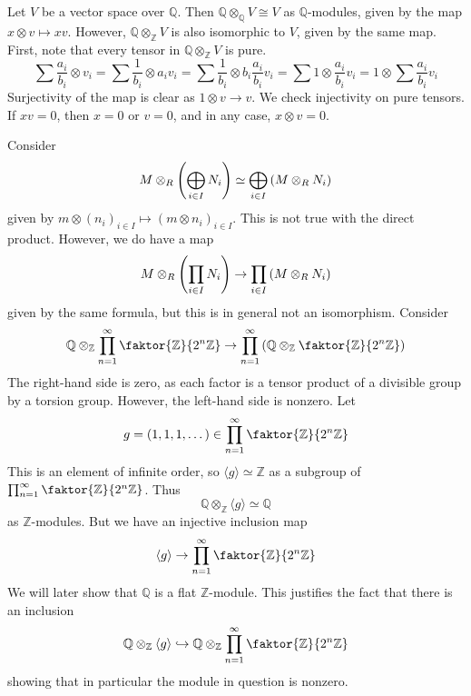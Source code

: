 \begin{example}
    Let \( V \) be a vector space over \( \mathbb Q \).
    Then \( \mathbb Q \otimes_{\mathbb Q} V \cong V \) as \( \mathbb Q \)-modules, given by the map \( x \otimes v \mapsto xv \).
    However, \( \mathbb Q \otimes_{\mathbb Z} V \) is also isomorphic to \( V \), given by the same map.
    First, note that every tensor in \( \mathbb Q \otimes_{\mathbb Z} V \) is pure.
    \[ \sum \frac{a_i}{b_i} \otimes v_i = \sum \frac{1}{b_i} \otimes a_i v_i = \sum \frac{1}{b_i} \otimes b_i \frac{a_i}{b_i} v_i = \sum 1 \otimes \frac{a_i}{b_i} v_i = 1 \otimes \sum \frac{a_i}{b_i} v_i \]
    Surjectivity of the map is clear as \( 1 \otimes v \to v \).
    We check injectivity on pure tensors.
    If \( xv = 0 \), then \( x = 0 \) or \( v = 0 \), and in any case, \( x \otimes v = 0 \).
\end{example}
\begin{example}
    Consider
    \[ M \otimes_R \qty(\bigoplus_{i \in I} N_i) \simeq \bigoplus_{i \in I} \qty(M \otimes_R N_i) \]
    given by \( m \otimes (n_i)_{i \in I} \mapsto (m \otimes n_i)_{i \in I} \).
    This is not true with the direct product.
    However, we do have a map
    \[ M \otimes_R \qty(\prod_{i \in I} N_i) \to \prod_{i \in I} \qty(M \otimes_R N_i) \]
    given by the same formula, but this is in general not an isomorphism.
    Consider
    \[ \mathbb Q \otimes_{\mathbb Z} \prod_{n = 1}^\infty \faktor{\mathbb Z}{2^n \mathbb Z} \to \prod_{n = 1}^\infty \qty(\mathbb Q \otimes_{\mathbb Z} \faktor{\mathbb Z}{2^n \mathbb Z}) \]
    The right-hand side is zero, as each factor is a tensor product of a divisible group by a torsion group.
    However, the left-hand side is nonzero.
    Let
    \[ g = (1, 1, 1, \dots) \in \prod_{n = 1}^\infty \faktor{\mathbb Z}{2^n \mathbb Z} \]
    This is an element of infinite order, so \( \langle g \rangle \simeq \mathbb Z \) as a subgroup of \( \prod_{n = 1}^\infty \faktor{\mathbb Z}{2^n \mathbb Z} \).
    Thus
    \[ \mathbb Q \otimes_{\mathbb Z} \langle g \rangle \simeq \mathbb Q \]
    as \( \mathbb Z \)-modules.
    But we have an injective inclusion map
    \[ \langle g \rangle \to \prod_{n = 1}^\infty \faktor{\mathbb Z}{2^n \mathbb Z} \]
    We will later show that \( \mathbb Q \) is a flat \( \mathbb Z \)-module.
    This justifies the fact that there is an inclusion
    \[ \mathbb Q \otimes_{\mathbb Z} \langle g \rangle \hookrightarrow \mathbb Q \otimes_{\mathbb Z} \prod_{n = 1}^\infty \faktor{\mathbb Z}{2^n \mathbb Z} \]
    showing that in particular the module in question is nonzero.
\end{example}
